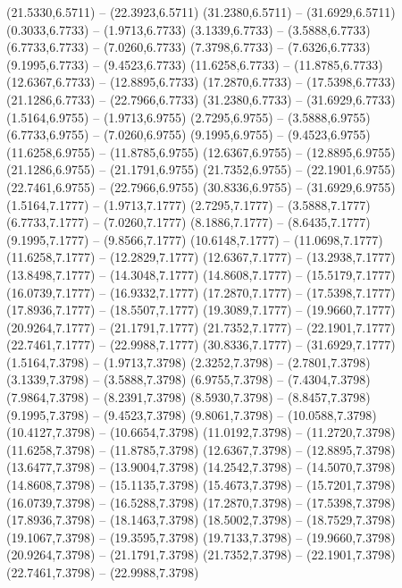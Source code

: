 {\begin{scope}[shift={(#1,#2)}]
    (21.5330,6.5711) -- (22.3923,6.5711)
    (31.2380,6.5711) -- (31.6929,6.5711)
    (0.3033,6.7733) -- (1.9713,6.7733)
    (3.1339,6.7733) -- (3.5888,6.7733)
    (6.7733,6.7733) -- (7.0260,6.7733)
    (7.3798,6.7733) -- (7.6326,6.7733)
    (9.1995,6.7733) -- (9.4523,6.7733)
    (11.6258,6.7733) -- (11.8785,6.7733)
    (12.6367,6.7733) -- (12.8895,6.7733)
    (17.2870,6.7733) -- (17.5398,6.7733)
    (21.1286,6.7733) -- (22.7966,6.7733)
    (31.2380,6.7733) -- (31.6929,6.7733)
    (1.5164,6.9755) -- (1.9713,6.9755)
    (2.7295,6.9755) -- (3.5888,6.9755)
    (6.7733,6.9755) -- (7.0260,6.9755)
    (9.1995,6.9755) -- (9.4523,6.9755)
    (11.6258,6.9755) -- (11.8785,6.9755)
    (12.6367,6.9755) -- (12.8895,6.9755)
    (21.1286,6.9755) -- (21.1791,6.9755)
    (21.7352,6.9755) -- (22.1901,6.9755)
    (22.7461,6.9755) -- (22.7966,6.9755)
    (30.8336,6.9755) -- (31.6929,6.9755)
    (1.5164,7.1777) -- (1.9713,7.1777)
    (2.7295,7.1777) -- (3.5888,7.1777)
    (6.7733,7.1777) -- (7.0260,7.1777)
    (8.1886,7.1777) -- (8.6435,7.1777)
    (9.1995,7.1777) -- (9.8566,7.1777)
    (10.6148,7.1777) -- (11.0698,7.1777)
    (11.6258,7.1777) -- (12.2829,7.1777)
    (12.6367,7.1777) -- (13.2938,7.1777)
    (13.8498,7.1777) -- (14.3048,7.1777)
    (14.8608,7.1777) -- (15.5179,7.1777)
    (16.0739,7.1777) -- (16.9332,7.1777)
    (17.2870,7.1777) -- (17.5398,7.1777)
    (17.8936,7.1777) -- (18.5507,7.1777)
    (19.3089,7.1777) -- (19.9660,7.1777)
    (20.9264,7.1777) -- (21.1791,7.1777)
    (21.7352,7.1777) -- (22.1901,7.1777)
    (22.7461,7.1777) -- (22.9988,7.1777)
    (30.8336,7.1777) -- (31.6929,7.1777)
    (1.5164,7.3798) -- (1.9713,7.3798)
    (2.3252,7.3798) -- (2.7801,7.3798)
    (3.1339,7.3798) -- (3.5888,7.3798)
    (6.9755,7.3798) -- (7.4304,7.3798)
    (7.9864,7.3798) -- (8.2391,7.3798)
    (8.5930,7.3798) -- (8.8457,7.3798)
    (9.1995,7.3798) -- (9.4523,7.3798)
    (9.8061,7.3798) -- (10.0588,7.3798)
    (10.4127,7.3798) -- (10.6654,7.3798)
    (11.0192,7.3798) -- (11.2720,7.3798)
    (11.6258,7.3798) -- (11.8785,7.3798)
    (12.6367,7.3798) -- (12.8895,7.3798)
    (13.6477,7.3798) -- (13.9004,7.3798)
    (14.2542,7.3798) -- (14.5070,7.3798)
    (14.8608,7.3798) -- (15.1135,7.3798)
    (15.4673,7.3798) -- (15.7201,7.3798)
    (16.0739,7.3798) -- (16.5288,7.3798)
    (17.2870,7.3798) -- (17.5398,7.3798)
    (17.8936,7.3798) -- (18.1463,7.3798)
    (18.5002,7.3798) -- (18.7529,7.3798)
    (19.1067,7.3798) -- (19.3595,7.3798)
    (19.7133,7.3798) -- (19.9660,7.3798)
    (20.9264,7.3798) -- (21.1791,7.3798)
    (21.7352,7.3798) -- (22.1901,7.3798)
    (22.7461,7.3798) -- (22.9988,7.3798)

\end{scope}}
